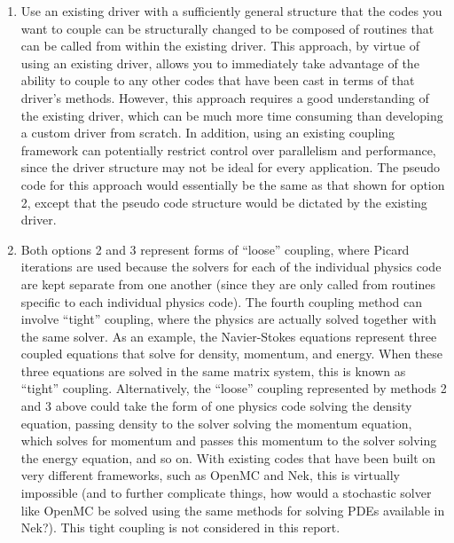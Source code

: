 \documentclass[10pt]{article}
\numberwithin{equation}{section} %
\begin{document}
\begin{enumerate}
	\begin{algorithm}[H]
	{\tt initialize OpenMC}\;
	{\tt initialize Nek}\;
	\;
	\end{algorithm}
\item Use an existing driver with a sufficiently general structure that the codes you want to couple can be structurally changed to be composed of routines that can be called from within the existing driver. This approach, by virtue of using an existing driver, allows you to immediately take advantage of the ability to couple to any other codes that have been cast in terms of that driver's methods. However, this approach requires a good understanding of the existing driver, which can be much more time consuming than developing a custom driver from scratch. In addition, using an existing coupling framework can potentially restrict control over parallelism and performance, since the driver structure may not be ideal for every application. The pseudo code for this approach would essentially be the same as that shown for option 2, except that the pseudo code structure would be dictated by the existing driver.
\item Both options 2 and 3 represent forms of ``loose'' coupling, where Picard iterations are used because the solvers for each of the individual physics code are kept separate from one another (since they are only called from routines specific to each individual physics code). The fourth coupling method can involve ``tight'' coupling, where the physics are actually solved together with the same solver. As an example, the Navier-Stokes equations represent three coupled equations that solve for density, momentum, and energy. When these three equations are solved in the same matrix system, this is known as ``tight'' coupling. Alternatively, the ``loose'' coupling represented by methods 2 and 3 above could take the form of one physics code solving the density equation, passing density to the solver solving the momentum equation, which solves for momentum and passes this momentum to the solver solving the energy equation, and so on. With existing codes that have been built on very different frameworks, such as OpenMC and Nek, this is virtually impossible (and to further complicate things, how would a stochastic solver like OpenMC be solved using the same methods for solving PDEs available in Nek?). This tight coupling is not considered in this report.
\end{enumerate}
\end{document}
